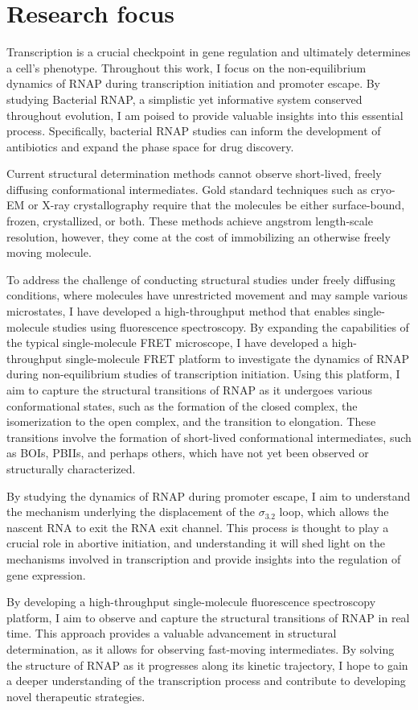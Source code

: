\section{\label{sec:research_focus} Research focus}

Transcription is a crucial checkpoint in gene regulation and ultimately determines a cell's phenotype. 
Throughout this work, I focus on the non-equilibrium dynamics of RNAP during transcription initiation and promoter escape. 
By studying Bacterial RNAP, a simplistic yet informative system conserved throughout evolution, I am poised to provide valuable insights into this essential process. 
Specifically, bacterial RNAP studies can inform the development of antibiotics and expand the phase space for drug discovery. 

Current structural determination methods cannot observe short-lived, freely diffusing conformational intermediates. 
Gold standard techniques such as cryo-EM or X-ray crystallography require that the molecules be either surface-bound, frozen, crystallized, or both. 
These methods achieve angstrom length-scale resolution, however, they come at the cost of immobilizing an otherwise freely moving molecule. 

To address the challenge of conducting structural studies under freely diffusing conditions, where molecules have unrestricted movement and may sample various microstates, I have developed a high-throughput method that enables single-molecule studies using fluorescence spectroscopy.
By expanding the capabilities of the typical single-molecule FRET microscope, I have developed a high-throughput single-molecule FRET platform to investigate the dynamics of RNAP during non-equilibrium studies of transcription initiation.
Using this platform, I aim to capture the structural transitions of RNAP as it undergoes various conformational states, such as the formation of the closed complex, the isomerization to the open complex, and the transition to elongation. 
These transitions involve the formation of short-lived conformational intermediates, such as \ac{BOIs}, \ac{PBIIs}, and perhaps others, which have not yet been observed or structurally characterized.

By studying the dynamics of RNAP during promoter escape, I aim to understand the mechanism underlying the displacement of the $\sigma_{3.2}$ loop, which allows the nascent RNA to exit the RNA exit channel. 
This process is thought to play a crucial role in abortive initiation, and understanding it will shed light on the mechanisms involved in transcription and provide insights into the regulation of gene expression.

By developing a high-throughput single-molecule fluorescence spectroscopy platform, I aim to observe and capture the structural transitions of RNAP in real time. 
This approach provides a valuable advancement in structural determination, as it allows for observing fast-moving intermediates. 
By solving the structure of RNAP as it progresses along its kinetic trajectory, I hope to gain a deeper understanding of the transcription process and contribute to developing novel therapeutic strategies.



